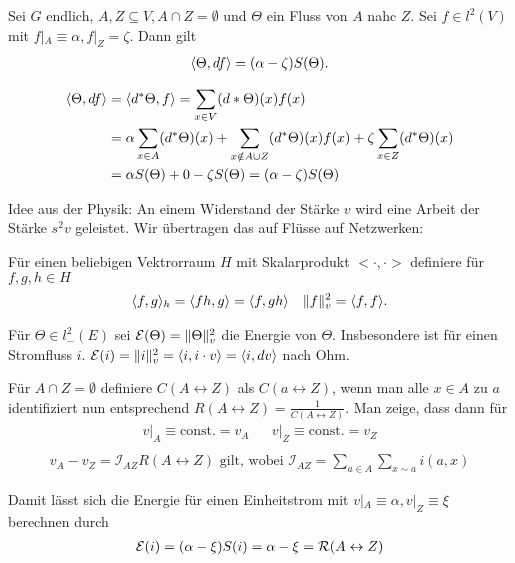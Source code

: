 \begin{lemma}
	Sei $G$ endlich, $A,Z \subseteq V, A\cap Z = \emptyset$ und $\Theta$ ein Fluss von $A$ nahc $Z$. Sei $f \in l^2(V)$ mit $f|_A \equiv \alpha, f|_Z = \zeta$. Dann gilt
	\begin{gather}
	\langle\Theta,df\rangle = (\alpha - \zeta) S(\Theta).
	\end{gather}
\end{lemma}
\begin{beweis}
	\begin{align}
	\langle\Theta,df\rangle &= \langle d^*\Theta,f\rangle = \sum\limits_{x \in V} (d*\Theta)(x)f(x) \\
	&= \alpha\sum\limits_{x\in A} (d^* \Theta)(x) + \sum\limits_{x \notin A \cup Z} (d^*\Theta)(x)f(x) + \zeta\sum\limits_{x\in Z} (d^*\Theta)(x) \\
	&= \alpha S(\Theta) + 0 - \zeta S(\Theta)  = (\alpha - \zeta) S(\Theta)
	\end{align}
\end{beweis}
Idee aus der Physik: An einem Widerstand der Stärke $v$ wird eine Arbeit der Stärke $s^2v$ geleistet. Wir übertragen das auf Flüsse auf Netzwerken:
\begin{definition}
	Für einen beliebigen Vektrorraum $H$ mit Skalarprodukt $<\cdot,\cdot>$ definiere für $f,g,h \in H$
	\begin{align}
	\langle f,g\rangle_h = \langle fh,g\rangle = \langle f,gh\rangle && \lVert f\rVert^2_v = \langle f,f\rangle.
	\end{align}
\end{definition}
Für $\Theta \in l^2_-(E)$ sei $\mathcal{E}(\Theta) = \lVert\Theta\rVert^2_v$ die Energie von $\Theta$. Insbesondere ist für einen Stromfluss $i$. $\mathcal{E}(i) = \lVert i\rVert^2_v = \langle i,i\cdot v\rangle  =\langle i, dv\rangle$ nach Ohm.

\begin{uebung}
	Für $A\cap Z = \emptyset$ definiere $C(A \leftrightarrow Z)$ als $C(a \leftrightarrow Z)$, wenn man alle $x \in A$ zu $a$ identifiziert nun entsprechend $R(A \leftrightarrow Z) = \frac{1}{C(A \leftrightarrow Z)}$. Man zeige, dass dann für
	\begin{align} 
	v|_A \equiv \text{const.} = v_A && v|_Z \equiv \text{const.} = v_Z \\ 
	\end{align}
	\begin{align}
	v_A - v_Z = \mathcal{I}_{AZ}R(A \leftrightarrow Z) \text{ gilt, wobei } \mathcal{I}_{AZ} = \sum\limits_{a \in A}\sum\limits_{x \sim a}i(a,x)
	\end{align}
	
	Damit lässt sich die Energie für einen Einheitstrom mit $v|_A \equiv \alpha, v|_Z \equiv \xi$ berechnen durch 
	\begin{align}
	\mathcal{E}(i) = \enb{\alpha - \xi} S(i) = \alpha - \xi = \mathcal{R}(A \leftrightarrow Z)
	\end{align}
\end{uebung}

